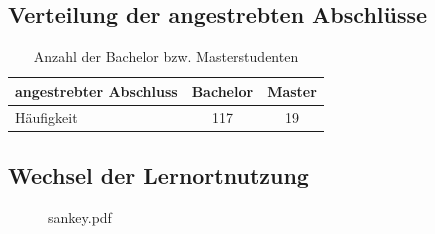 \documentclass[11pt, a4paper]{article}
\begin{document}
\subsection*{Verteilung der angestrebten Abschlüsse}
\begin{table}[h]
	\centering
	\begin{tabular}{l|cc}
		angestrebter Abschluss & Bachelor & Master \\ \hline
		Häufigkeit & 117 & 19
	\end{tabular}
	\vspace{0.5cm}
	\caption{Anzahl der Bachelor bzw. Masterstudenten}
\end{table}

\newpage
\subsection*{Wechsel der Lernortnutzung}
\vspace{-2cm}
\begin{figure}[h]
	 {sankey.pdf}
\end{figure}
\end{document}
